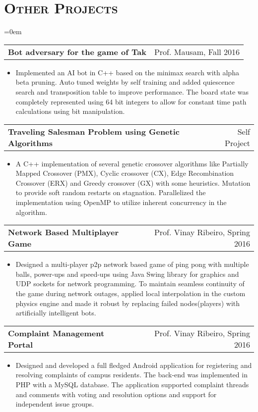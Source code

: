 \documentclass{article}
\makeatletter
\newenvironment{longversion}{}{} %
\newcommand{\headerrow}[2]
{\begin{tabular*}{\linewidth}{l@{\extracolsep{\fill}}r}
	#1 &
	#2 \\
\end{tabular*}}
\newcommand{\tmpsection}[1]{}
\let\tmpsection=\section
\renewcommand{\section}[1]{\tmpsection*{\textsc{#1}}}
\makeatother
\begin{document}
\begin{longversion}
\section{Other Projects}
\begin{list} {}{\leftmargin=0em}
\setlength{\leftmargin}{0pt}

\item[]
  \headerrow{ \textbf{Bot adversary for the game of Tak}} {Prof. Mausam, Fall 2016}
  \begin{itemize} \item[]
  Implemented an AI bot in C++ based on the minimax search with alpha beta pruning. Auto tuned weights by self training and added quiescence search and transposition table to improve performance. The board state was completely represented using 64 bit integers to allow for constant time path calculations using bit manipulation.
  \end{itemize}
  
\item[]
  \headerrow {\textbf{ Traveling Salesman Problem using Genetic Algorithms}} {Self Project}
  \begin{itemize} \item[]
  A C++ implementation of several genetic crossover algorithms like Partially Mapped Crossover (PMX), Cyclic crossover (CX),  Edge Recombination Crossover (ERX) and Greedy crossover (GX) with some heuristics. Mutation to provide soft random restarts on stagnation. Parallelized the implementation using OpenMP to utilize inherent concurrency in the algorithm.
  \end{itemize}

\item[]
  \headerrow {\textbf{Network Based Multiplayer Game}} {Prof. Vinay Ribeiro, Spring 2016}
  \begin{itemize} \item[]
  Designed a multi-player p2p network based game of ping pong with multiple balls, power-ups and speed-ups using Java Swing library for graphics and UDP sockets for network programming. To maintain seamless continuity of the game during network outages, applied local interpolation in the custom physics engine and made it robust by replacing failed nodes(players) with artificially intelligent bots.
  \end{itemize}
  
\item[]
  \headerrow{ \textbf{Complaint Management Portal}} {Prof. Vinay Ribeiro, Spring 2016}
  \begin{itemize} \item[]
  Designed and developed a full fledged Android application for registering and resolving complaints of campus residents. The back-end was implemented in PHP with a MySQL database. The application supported complaint threads and comments with voting and resolution options and support for independent issue groups.
  \end{itemize}
  

\end{list}
\end{longversion}
\end{document}
